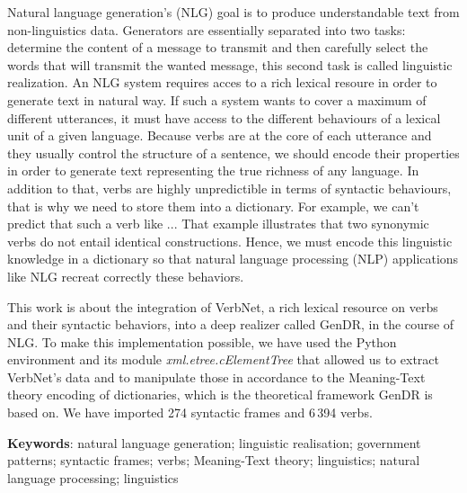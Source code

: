 Natural language generation's (NLG) goal is to produce understandable text from non-linguistics data. Generators are essentially separated into two tasks: determine the content of a message to transmit and then carefully select the words that will transmit the wanted message, this second task is called linguistic realization. An NLG system requires acces to a rich lexical resoure in order to generate text in natural way. If such a system wants to cover a maximum of different utterances, it must have access to the different behaviours of a lexical unit of a given language. Because verbs are at the core of each utterance and they usually control the structure of a sentence, we should encode their properties in order to generate text representing the true richness of any language. In addition to that, verbs are highly unpredictible in terms of syntactic behaviours, that is why we need to store them into a dictionary. For example, we can't predict that such a verb like ... That example illustrates that two synonymic verbs do not entail identical constructions. Hence, we must encode this linguistic knowledge in a dictionary so that natural language processing (NLP) applications like NLG recreat correctly these behaviors.

This work is about the integration of VerbNet, a rich lexical resource on verbs and their syntactic behaviors, into a deep realizer called GenDR, in the course of NLG. To make this implementation possible, we have used the Python environment and its module \emph{xml.etree.cElementTree} that allowed us to extract VerbNet's data and to manipulate those in accordance to the Meaning-Text theory encoding of dictionaries, which is the theoretical framework GenDR is based on. We have imported 274 syntactic frames and 6\,394 verbs.

\textbf{Keywords}: natural language generation; linguistic realisation; government patterns; syntactic frames; verbs; Meaning-Text theory; linguistics; natural language processing; linguistics